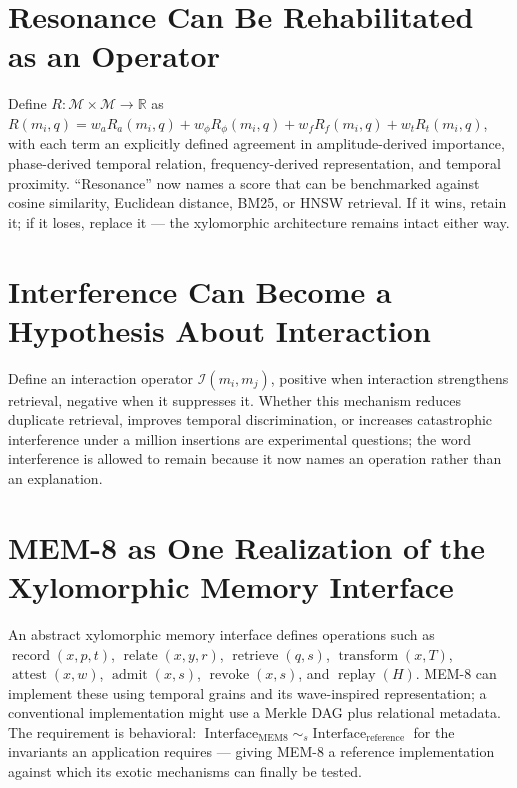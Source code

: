 \documentclass[12pt]{article}
\begin{document}
\section{Resonance Can Be Rehabilitated as an Operator}

Define $R:\mathcal{M}\times\mathcal{M}\to\mathbb{R}$ as $R(m_i,q)=w_aR_a(m_i,q)+w_\phi R_\phi(m_i,q)+w_fR_f(m_i,q)+w_tR_t(m_i,q)$, with each term an explicitly defined agreement in amplitude-derived importance, phase-derived temporal relation, frequency-derived representation, and temporal proximity. ``Resonance'' now names a score that can be benchmarked against cosine similarity, Euclidean distance, BM25, or HNSW retrieval. If it wins, retain it; if it loses, replace it — the xylomorphic architecture remains intact either way.

\section{Interference Can Become a Hypothesis About Interaction}

Define an interaction operator $\mathcal{I}(m_i,m_j)$, positive when interaction strengthens retrieval, negative when it suppresses it. Whether this mechanism reduces duplicate retrieval, improves temporal discrimination, or increases catastrophic interference under a million insertions are experimental questions; the word interference is allowed to remain because it now names an operation rather than an explanation.

\section{MEM-8 as One Realization of the Xylomorphic Memory Interface}

An abstract xylomorphic memory interface defines operations such as $\operatorname{record}(x,p,t)$, $\operatorname{relate}(x,y,r)$, $\operatorname{retrieve}(q,s)$, $\operatorname{transform}(x,T)$, $\operatorname{attest}(x,w)$, $\operatorname{admit}(x,s)$, $\operatorname{revoke}(x,s)$, and $\operatorname{replay}(H)$. MEM-8 can implement these using temporal grains and its wave-inspired representation; a conventional implementation might use a Merkle DAG plus relational metadata. The requirement is behavioral: $\operatorname{Interface}_{\mathrm{MEM8}}\sim_s\operatorname{Interface}_{\mathrm{reference}}$ for the invariants an application requires — giving MEM-8 a reference implementation against which its exotic mechanisms can finally be tested.
\end{document}
